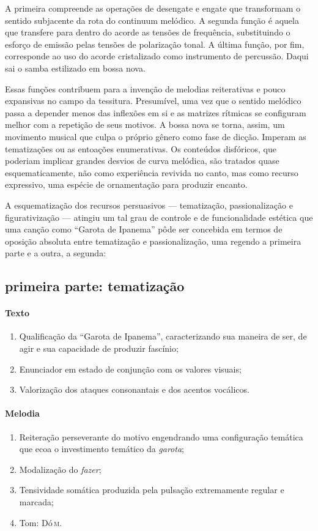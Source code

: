 A primeira compreende as operações de desengate e engate que transformam
o sentido subjacente da rota do continuum melódico. A segunda função é
aquela que transfere para dentro do acorde as tensões de frequência,
substituindo o esforço de emissão pelas tensões de polarização tonal. A
última função, por fim, corresponde ao uso do acorde cristalizado como
instrumento de percussão. Daqui sai o samba estilizado em bossa nova.

Essas funções contribuem para a invenção de melodias reiterativas e
pouco expansivas no campo da tessitura. Presumível, uma vez que o
sentido melódico passa a depender menos das inflexões em si e as
matrizes rítmicas se configuram melhor com a repetição de seus motivos.
A bossa nova se torna, assim, um movimento musical que culpa o próprio
gênero como fase de dicção. Imperam as tematizações ou as entoações
enumerativas. Os conteúdos disfóricos, que poderiam implicar grandes
desvios de curva melódica, são tratados quase esquematicamente, não como
experiência revivida no canto, mas como recurso expressivo, uma espécie
de ornamentação para produzir encanto.

A esquematização dos recursos persuasivos --- tematização, passionalização
e figurativização --- atingiu um tal grau de controle e de funcionalidade
estética que uma canção como ``Garota de Ipanema'' pôde ser concebida em
termos de oposição absoluta entre tematização e passionalização, uma
regendo a primeira parte e a outra, a segunda:

\subsection{primeira parte: tematização}


\paragraph{Texto} 
\begin{enumerate}
\item Qualificação da ``Garota de Ipanema'', caracterizando sua maneira de ser, de
agir e sua capacidade de produzir fascínio;
\item Enunciador em estado de conjunção com os valores visuais;
\item Valorização dos ataques consonantais e dos acentos vocálicos.
\end{enumerate}

\paragraph{Melodia}
\begin{enumerate}
\item Reiteração perseverante do motivo engendrando uma configuração temática
que ecoa o investimento temático da \textit{garota};
\item Modalização do \textit{fazer};
\item Tensividade somática produzida pela pulsação extremamente regular e
marcada;
\item Tom: Dó\,\textsc{m}.
\end{enumerate}

